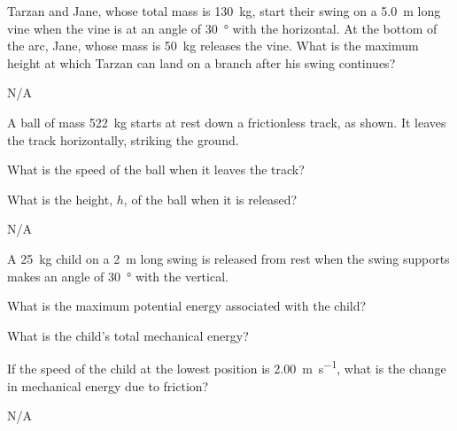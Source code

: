 


\begin{question}[ID=energy-A-Q01,topic=energy,difficulty=A]
    Tarzan and Jane, whose total mass is \SI{130}{\kilo\gram},
        start their swing on a \SI{5.0}{\meter} long vine when
        the vine is at an angle of \SI{30}{\degree} with the
        horizontal.
    At the bottom of the arc, Jane, whose mass is \SI{50}{\kilo\gram}
        releases the vine.
    What is the maximum height at which Tarzan can land on a branch
        after his swing continues?
\end{question}
\begin{solution}
    N/A
\end{solution}


\begin{question}[ID=energy-A-Q02,topic=energy,difficulty=A]
    A ball of mass \SI{522}{\kilo\gram} starts at rest down a
        frictionless track, as shown.
    It leaves the track horizontally, striking the ground.
    \begin{enumerate*}[label=\arabic*)]
        \item What is the speed of the ball when it leaves the track?
        \item What is the height, $h$, of the ball when it is released?
    \end{enumerate*}
\end{question}
\begin{solution}
    N/A
\end{solution}


\begin{question}[ID=energy-A-Q03,topic=energy,difficulty=A]
    A \SI{25}{\kilo\gram} child on a \SI{2}{\meter} long swing
        is released from rest when the swing supports makes an
        angle of \SI{30}{\degree} with the vertical.
    \begin{enumerate*}[label=\arabic*)]
        \item What is the maximum potential energy
            associated with the child?
        \item What is the child's total mechanical energy?
        \item If the speed of the child at the lowest position
            is \SI{2.00}{\meter\per\second}, what is the change
            in mechanical energy due to friction?
    \end{enumerate*}
\end{question}
\begin{solution}
    N/A
\end{solution}


